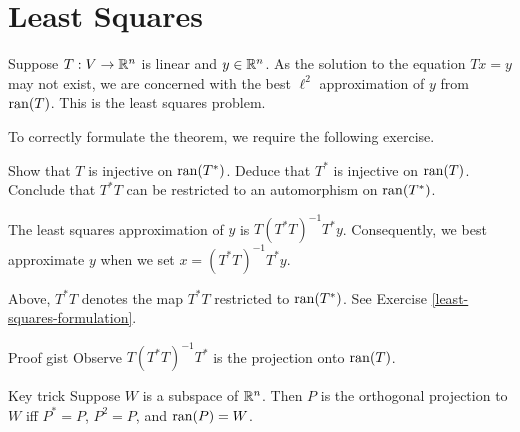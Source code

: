 \section{Least Squares}
Suppose $T: V \rightarrow {\mathbb R}^n$ is linear and $y \in {\mathbb R}^n$. As the solution to the equation $Tx = y$ may not exist, we are concerned with the best $\ell^2$ approximation of $y$ from $\operatorname{ran}(T)$. This is the least squares problem.

To correctly formulate the theorem, we require the following exercise.
\begin{exercise}
    \label{least-squares-formulation}
    Show that $T$ is injective on $\operatorname{ran}(T^*)$. Deduce that $T^*$ is injective on $\operatorname{ran}(T)$. Conclude that $T^*T$ can be restricted to an automorphism on $\operatorname{ran}(T^*)$.
\end{exercise}

\begin{thm}
    The least squares approximation of $y$ is $T(T^*T)^{-1}T^*y$. Consequently, we best approximate $y$ when we set $x = (T^*T)^{-1}T^*y$.
\end{thm}

\begin{remark}
    Above, $T^*T$ denotes the map $T^*T$ restricted to $\operatorname{ran}(T^*)$. See Exercise \ref{least-squares-formulation}.
\end{remark}

\begin{details}{Proof gist}
    Observe $T(T^*T)^{-1}T^*$ is the projection onto $\operatorname{ran}(T)$.
\end{details}

\begin{details}{Key trick}
    Suppose $W$ is a subspace of ${\mathbb R}^n$. Then $P$ is the orthogonal projection to $W$ iff $P^*=P$, $P^2 = P$, and $\operatorname{ran}(P) = W$.
\end{details}
